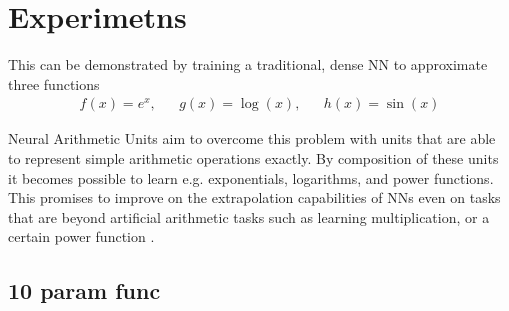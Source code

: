 \documentclass[9pt]{article}
\begin{document}
\section{Experimetns}%
\label{sec:experimetns}
This can be demonstrated by training a traditional, dense NN to approximate
three functions
\begin{align}
  \label{eq:approx_tasks}
  f(x) = e^x, && g(x) = \log(x), && h(x) = \sin(x)
\end{align}

Neural Arithmetic Units aim to overcome this problem with units that are able
to represent simple arithmetic operations exactly. By composition of these
units it becomes possible to learn e.g. exponentials, logarithms, and power
functions. This promises to improve on the extrapolation capabilities of NNs
even on tasks that are beyond artificial arithmetic tasks such as learning
multiplication, or a certain power function .


\subsection{10 param func}%
\label{sub:10_param_func}
\end{document}
